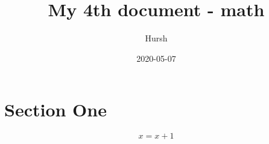 \documentclass{article}
\title{My 4th document - math}
\date{2020-05-07}
\author{Hursh}
\begin{document}
\maketitle
{}
\newpage
{}
\section{Section One}
\begin{equation}
x=x+1
\end{equation}
\end{document}
